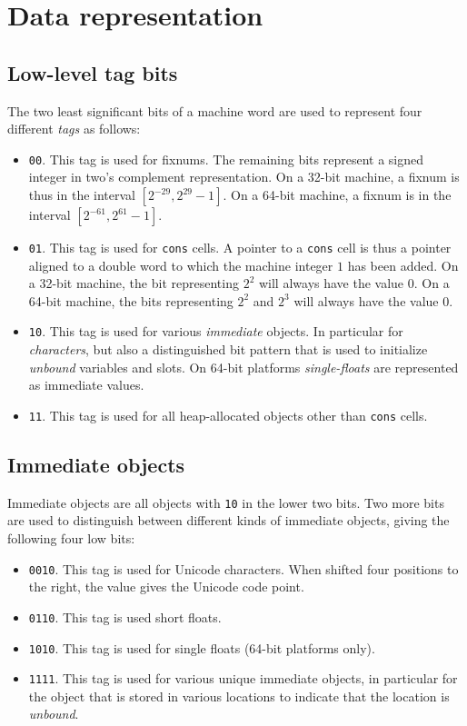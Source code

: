 \chapter{Data representation}
\label{chap-data-representation}

\section{Low-level tag bits}

The two least significant bits of a machine word are used to represent
four different \emph{tags} as follows:

\begin{itemize}
\item \texttt{00}.  This tag is used for fixnums.  The remaining bits
  represent a signed integer in two's complement representation.  On a
  32-bit machine, a fixnum is thus in the interval $[2^{-29}, 2^{29} -
    1]$.  On a 64-bit machine, a fixnum is in the interval $[2^{-61}, 2^{61} -
    1]$.  
\item \texttt{01}.  This tag is used for \texttt{cons} cells.  A
  pointer to a \texttt{cons} cell is thus a pointer aligned to a
  double word to which the machine integer $1$ has been added.  On a
  32-bit machine, the bit representing $2^2$ will always have the
  value $0$.  On a 64-bit machine, the bits representing $2^2$ and
  $2^3$ will always have the value $0$.
\item \texttt{10}.  This tag is used for various \emph{immediate}
  objects.  In particular for \emph{characters}, but also a
  distinguished bit pattern that is used to initialize \emph{unbound}
  variables and slots.  On 64-bit platforms \emph{single-floats} are
  represented as immediate values. 
\item \texttt{11}.  This tag is used for all heap-allocated objects
  other than \texttt{cons} cells.
\end{itemize}

\section{Immediate objects}

Immediate objects are all objects with \texttt{10} in the lower two
bits.  Two more bits are used to distinguish between different kinds
of immediate objects, giving the following four low bits:

\begin{itemize}
\item \texttt{0010}.  This tag is used for Unicode characters.  When
  shifted four positions to the right, the value gives the Unicode
  code point. 
\item \texttt{0110}.  This tag is used short floats.  
\item \texttt{1010}.  This tag is used for single floats (64-bit
  platforms only). 
\item \texttt{1111}.  This tag is used for various unique immediate
  objects, in particular for the object that is stored in various
  locations to indicate that the location is \emph{unbound}. 
\end{itemize}

